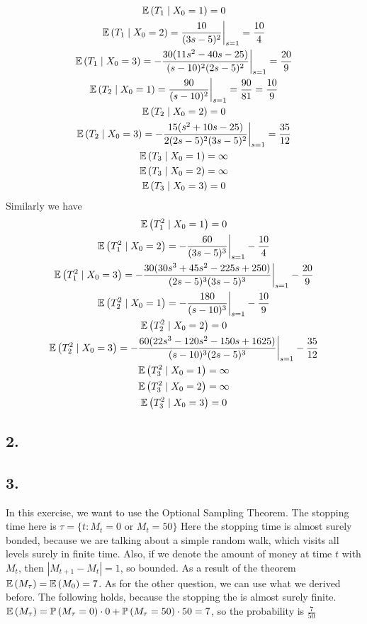 \begin{gather*}
    \mathbb{E}\left( T_{1} \mid X_0=1 \right) = 0 \\
    \mathbb{E}\left( T_{1} \mid X_0=2 \right) =  \frac{10}{(3s-5)^2}\bigg\rvert_{s=1}=\frac{10}{4}\\
    \mathbb{E}\left( T_{1} \mid X_0=3 \right)  = -\frac{30(11s^2-40s-25)}{(s-10)^2(2s-5)^2}\bigg\rvert_{s=1}=\frac{20}{9}\\
    \mathbb{E}\left( T_{2} \mid X_0=1 \right) = \frac{90}{(s-10)^2}\bigg\rvert_{s=1} =  \frac{90}{81}=\frac{10}{9}\\
    \mathbb{E}\left( T_{2} \mid X_0=2 \right)  = 0\\
    \mathbb{E}\left( T_{2} \mid X_0=3 \right)  = -\frac{15(s^2+10s-25)}{2(2s-5)^2(3s-5)^2}\bigg\rvert_{s=1}= \frac{35}{12}\\
    \mathbb{E}\left( T_{3} \mid X_0=1 \right) = \infty\\
    \mathbb{E}\left( T_{3} \mid X_0=2 \right) = \infty\\
    \mathbb{E}\left( T_{3} \mid X_0=3 \right) = 0 \\
\end{gather*}
Similarly we have
\begin{gather*}
    \mathbb{E}\left( T_{1}^2 \mid X_0=1 \right) = 0\\
    \mathbb{E}\left( T_{1}^2 \mid X_0=2 \right)  = -\frac{60}{(3s-5)^3}\bigg\rvert_{s=1}-\frac{10}{4}\\
    \mathbb{E}\left( T_{1}^2 \mid X_0=3 \right) = -\frac{30(30s^3+45s^2-225s+250)}{(2s-5)^3(3s-5)^3}\bigg\rvert_{s=1} - \frac{20}{9}\\
    \mathbb{E}\left( T_{2}^2 \mid X_0=1 \right)  = -\frac{180}{(s-10)^3}\bigg\rvert_{s=1}-\frac{10}{9}\\
    \mathbb{E}\left( T_{2}^2 \mid X_0=2 \right)  = 0\\ 
    \mathbb{E}\left( T_{2}^2 \mid X_0=3 \right) =-\frac{60(22s^3-120s^2-150s+1625)}{(s-10)^3(2s-5)^3}\bigg\rvert_{s=1}- \frac{35}{12}\\
    \mathbb{E}\left( T_{3}^2 \mid X_0=1 \right) = \infty\\
    \mathbb{E}\left( T_{3}^2 \mid X_0=2 \right) = \infty\\
    \mathbb{E}\left( T_{3}^2 \mid X_0=3 \right)  = 0\\
\end{gather*}


\subsection*{2.}
\subsection*{3.}
In this exercise, we want to use the Optional Sampling Theorem. The stopping time here is $\tau = \{t : M_t = 0 \text{ or } M_t =50\}$
Here the stopping time is almost surely bonded, because we are talking about a simple random walk, which visits all levels surely in finite time. Also, if we denote the amount of money at time $t$ with $M_t$, then $|M_{t+1}- M_t| = 1 $, so bounded. As a result of the theorem $\mathbb{E}\left( M_\tau \right) = \mathbb{E}\left( M_0 \right) = 7$. As for the other question, we can use what we derived before. The following holds, because the stopping the is almost surely finite. $\mathbb{E}\left( M_\tau \right) = \mathbb{P}\left( M_\tau = 0 \right) \cdot 0+ \mathbb{P}\left( M_\tau = 50 \right) \cdot 50 = 7 $, so the probability is $\frac{7}{50}$

